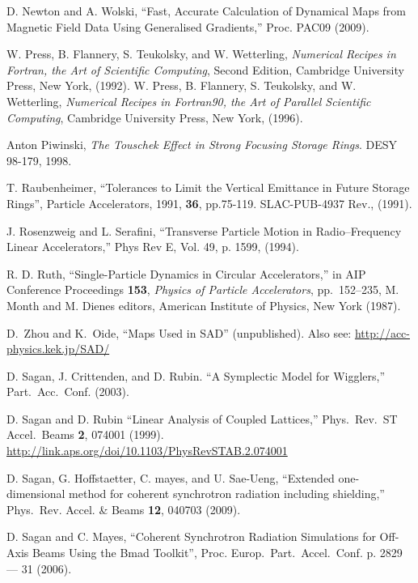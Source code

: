 \begin{thebibliography}{XXXXXXX99}
D. Newton and A. Wolski, 
``Fast, Accurate Calculation of Dynamical Maps from
Magnetic Field Data Using Generalised Gradients,''
Proc. PAC09 (2009).

W. Press, B. Flannery, S. Teukolsky, and W. Wetterling, {\em Numerical
Recipes in Fortran, the Art of Scientific Computing}, Second Edition,
Cambridge University Press, New York, (1992). \hfill \break
W. Press, B. Flannery, S. Teukolsky, and W. Wetterling, {\em Numerical
Recipes in Fortran90, the Art of Parallel Scientific Computing}, 
Cambridge University Press, New York, (1996).

Anton Piwinski, \emph{The Touschek Effect in Strong Focusing Storage Rings}.
DESY 98-179, 1998.

T. Raubenheimer,
``Tolerances to Limit the Vertical Emittance in Future Storage Rings'', 
Particle Accelerators, 1991, {\bf 36}, pp.75-119. 
SLAC-PUB-4937 Rev., (1991).

J. Rosenzweig and L. Serafini, ``Transverse Particle Motion in
Radio--Frequency Linear Accelerators,'' Phys Rev E, Vol. 49, p. 1599,
(1994).

 R. D. Ruth, ``Single-Particle Dynamics in
Circular Accelerators,'' in AIP Conference Proceedings {\bf 153}, {\em
Physics of Particle Accelerators}, pp.~152--235, M. Month and M. Dienes editors,
American Institute of Physics, New York (1987).

D.~Zhou and K.~Oide, ``Maps Used in SAD'' (unpublished).
Also see:
\hfill\break
\hspace*{0.3in} \url{http://acc-physics.kek.jp/SAD/}

D. Sagan, J. Crittenden, and D. Rubin.
``A Symplectic Model for Wigglers,'' Part.\ Acc.\ Conf. (2003).

D. Sagan and D. Rubin ``Linear Analysis of Coupled Lattices,''
Phys.\ Rev.\ ST Accel.\ Beams {\bf 2}, 074001 (1999).
\hfill\break
\hspace*{20pt} 
\url{http://link.aps.org/doi/10.1103/PhysRevSTAB.2.074001}

D. Sagan, G. Hoffstaetter, C. mayes, and U. Sae-Ueng,
``Extended one-dimensional method for coherent synchrotron radiation including shielding,''
Phys.\ Rev. Accel. \& Beams {\bf 12}, 040703 (2009).

D. Sagan and C. Mayes, 
``Coherent Synchrotron Radiation Simulations for Off-Axis Beams Using the Bmad Toolkit'',
Proc. Europ.\ Part.\ Accel.\ Conf. p. 2829 --- 31 (2006).


\end{thebibliography}
